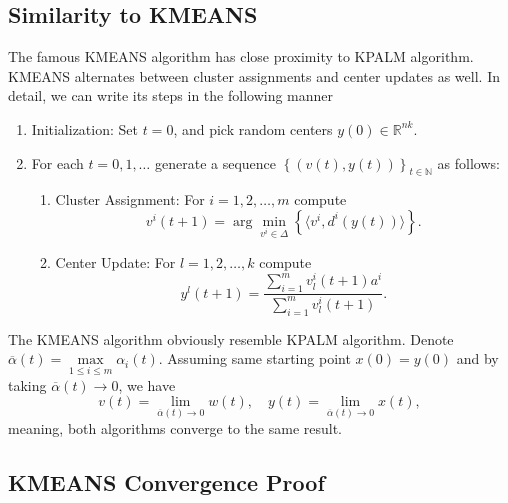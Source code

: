 \documentclass[11pt]{article}
\numberwithin{equation}{section}
\begin{document}
\subsection{Similarity to KMEANS}
The famous KMEANS algorithm has close proximity to KPALM algorithm. KMEANS alternates between cluster assignments and center updates as well. In detail, we can write its steps in the following manner

\begin{enumerate}[(1)]
	\item Initialization: Set $t=0$, and pick random centers $y(0) \in \mathbb{R}^{nk}$.

	\item For each $t=0,1, \ldots$ generate a sequence $\left\lbrace(v(t),y(t))\right\rbrace_{t \in \mathbb{N}}$ as follows:
	\begin{enumerate}[(2.1)]
		\item Cluster Assignment: For $i=1, 2, \ldots ,m$ compute
		\begin{equation}
			v^i(t+1) = \arg\min\limits_{v^i \in \Delta} \left\lbrace \langle v^i , d^i(y(t)) \rangle\right\rbrace . \label{StateEq12}
		\end{equation}
		
		\item Center Update: For $l=1, 2, \ldots ,k$ compute
		\begin{equation}
			y^l(t+1) = \frac{\sum_{i=1}^{m} v^i_l(t+1) a^i}{\sum_{i=1}^{m} v^i_l(t+1)} . \label{StateEq13}
		\end{equation}
	\end{enumerate}
\end{enumerate}
The KMEANS algorithm obviously resemble KPALM algorithm. Denote $\overline{\alpha}(t) = \max\limits_{1 \leq i \leq m} \alpha_i(t)$. Assuming same starting point $x(0) = y(0)$ and by taking $\overline{\alpha}(t) \to 0$, we have
\begin{equation*}
	v(t) = \lim_{\overline{\alpha}(t) \to 0} w(t), \quad
	y(t) = \lim_{\overline{\alpha}(t) \to 0} x(t),
\end{equation*}
meaning, both algorithms converge to the same result.

\subsection{KMEANS Convergence Proof}
\end{document}
